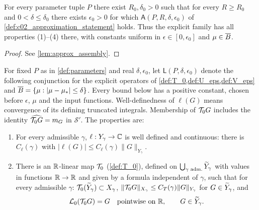 \begin{theorem}
  \label{thm:fixed_point_approximation}
  For every parameter tuple $P$ there exist $R_0,\delta_0>0$ such that for every $R\ge R_0$
  and $0<\delta\le\delta_0$ there exists $\epsilon_0>0$ for which
  $\mathsf A(P,R,\delta,\epsilon_0)$ of \cref{def:c02_approximation_statement} holds.
  Thus the explicit family has all properties (1)--(4) there, with constants uniform in
  $\epsilon\in[0,\epsilon_0]$ and $\mu\in\overline{B}$.
\end{theorem}
\begin{proof}
  See \cref{lem:approx_assembly}.
\end{proof}

\begin{definition}
  \label{def:c02_linear_inverse_statement}
  For fixed $P$ as in \cref{def:parameters} and real $\delta,\epsilon_0$, let
  $\mathsf L(P,\delta,\epsilon_0)$ denote the following conjunction for the explicit operators
  of \cref{def:T_0,def:U_eps,def:V_eps} and $\overline{B}=\{\mu:|\mu-\mu_*|\le\delta\}$.
  Every bound below has a positive constant, chosen before $\epsilon$, $\mu$ and the input functions.
  Well-definedness of $\ell(G)$ means convergence of its defining truncated integrals.
  Membership of $\mathcal{T}_0G$ includes the identity $\widehat{\mathcal{T}_0G}=m_G$ in $\mathcal S'$.
  The properties are:
  \begin{enumerate}
    \item For every admissible $\gamma$, $\ell:Y_\gamma\to\mathbb{C}$ is well defined and continuous: there is
      $C_\ell(\gamma)$ with $|\ell(G)|\le C_\ell(\gamma)\|G\|_{Y_\gamma}$.
    \item There is an $\mathbb{R}$-linear map $\mathcal{T}_0$ (\cref{def:T_0}), defined on $\bigcup_{\gamma\text{ adm.}}\widetilde{Y}_\gamma$
      with values in functions $\mathbb{R}\to\mathbb{R}$ and given by a formula independent of $\gamma$, such that for every
      admissible $\gamma$: $\mathcal{T}_0(\widetilde{Y}_\gamma)\subset X_\gamma$, $\|\mathcal{T}_0G\|_{X_\gamma}\le C_T(\gamma)\|G\|_{Y_\gamma}$ for
      $G\in\widetilde{Y}_\gamma$, and
      \begin{equation}\label{eqn:fixed_point_free_inverse}
        \mc L_0(\mc T_0G)=G\quad\text{pointwise on }\R,\qquad G\in\sq Y_\gamma .

\end{equation}
\end{enumerate}
\end{definition}

